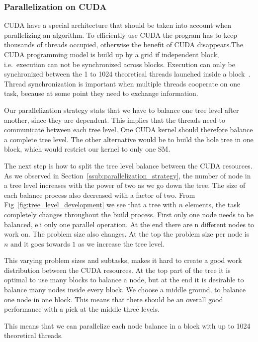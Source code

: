 \subsubsection{Parallelization on CUDA} %
\label{ssub:divide_work_on_cuda}


CUDA have a special architecture that should be taken into account when parallelizing an algorithm. To efficiently use CUDA the program has to keep thousands of threads occupied, otherwise the benefit of CUDA disappears.The CUDA programming model is build up by a grid if independent block, i.e.\ execution can not be synchronized across blocks. Execution can only be synchronized between the 1 to 1024 theoretical threads launched inside a block~\cite{cuda_programming_guide}. Thread synchronization is important when multiple threads cooperate on one task, because at some point they need to exchange information.


Our parallelization strategy stats that we have to balance one tree level after another, since they are dependent. This implies that the threads need to communicate between each tree level. One CUDA kernel should therefore balance a complete tree level. The other alternative would be to build the hole tree in one block, which would restrict our kernel to only one SM\@.

The next step is how to split the tree level balance between the CUDA resources. As we observed in Section~\ref{ssub:parallelization_strategy}, the number of node in a tree level increases with the power of two as we go down the tree. The size of each balance process also decreased with a factor of two. From Fig~\ref{fig:tree_level_development} we see that a tree with $n$ elements, the task completely changes throughout the build process. First  only one node needs to be balanced, e.i only one parallel operation. At the end there are n different nodes to work on. The problem size also changes. At the top the problem size per node is $n$ and it goes towards $1$ as we increase the tree level.


This varying problem sizes and subtasks, makes it hard to create a good work distribution between the CUDA resources. At the top part of the tree it is optimal to use many blocks to balance a node, but at the end it is desirable to balance many nodes inside every block. We choose a middle ground, to balance one node in one block. This means that there should be an overall good performance with a pick at the middle three levels.


This means that we can parallelize each node balance in a block with up to 1024 theoretical threads.





